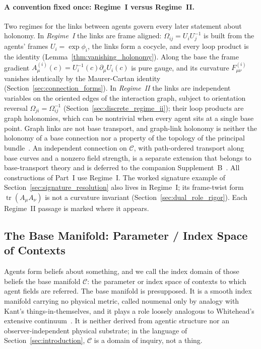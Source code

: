 \documentclass[11pt]{article}
\begin{document}
\paragraph{A convention fixed once: Regime~I versus Regime~II.}
\label{sec:regime_convention}
Two regimes for the links between agents govern every later statement about holonomy. In \emph{Regime~I} the links are frame aligned: $\Omega_{ij} = U_iU_j^{-1}$ is built from the agents' frames $U_i = \exp\phi_i$, the links form a cocycle, and every loop product is the identity (Lemma~\ref{thm:vanishing_holonomy}). Along the base the frame gradient $A^{(i)}_\mu(c) = U_i^{-1}(c)\partial_\mu U_i(c)$ is pure gauge, and its curvature $F^{(i)}_{\mu\nu}$ vanishes identically by the Maurer-Cartan identity (Section~\ref{sec:connection_forms}). In \emph{Regime~II} the links are independent variables on the oriented edges of the interaction graph, subject to orientation reversal $\Omega_{ji} = \Omega_{ij}^{-1}$ (Section~\ref{sec:discrete_regime_ii}); their loop products are graph holonomies, which can be nontrivial when every agent sits at a single base point. Graph links are not base transport, and graph-link holonomy is neither the holonomy of a base connection nor a property of the topology of the principal bundle~\cite[Ch.~1]{DennisGaugeVFE2026}. An independent connection on $\mathcal{C}$, with path-ordered transport along base curves and a nonzero field strength, is a separate extension that belongs to base-transport theory and is deferred to the companion Supplement~B~\cite{DennisGaugeVFESuppB2026}. All constructions of Part~I use Regime~I. The worked signature example of Section~\ref{sec:signature_resolution} also lives in Regime~I; its frame-twist form $\operatorname{tr}(A_\mu A_\nu)$ is not a curvature invariant (Section~\ref{sec:dual_role_rigor}). Each Regime~II passage is marked where it appears.

\subsection{The Base Manifold: Parameter / Index Space of Contexts}

Agents form beliefs about something, and we call the index domain of those beliefs the base manifold $\mathcal{C}$: the parameter or index space of contexts to which agent fields are referred. The base manifold is presupposed. It is a smooth index manifold carrying no physical metric, called noumenal only by analogy with Kant's things-in-themselves, and it plays a role loosely analogous to Whitehead's extensive continuum~\cite{Whitehead1929}. It is neither derived from agentic structure nor an observer-independent physical substrate; in the language of Section~\ref{sec:introduction}, $\mathcal{C}$ is a domain of inquiry, not a thing.
\end{document}
